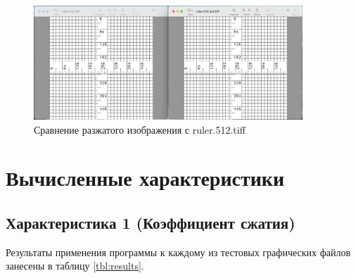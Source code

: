 \documentclass[a4paper,oneside]{article}
\theoremstyle{definition}
\begin{document}
\begin{figure}[H]
  \centering
  \includegraphics[width=0.9\textwidth]{test3_img.jpg}
  \caption{Сравнение разжатого изображения с ruler.512.tiff}
  \label{fig:test_3_img}
\end{figure}

\section{Вычисленные характеристики}

\subsection{Характеристика 1 (Коэффициент сжатия)}

Результаты применения программы к каждому из тестовых графических файлов занесены
в таблицу \ref{tbl:results}.
\end{document}
